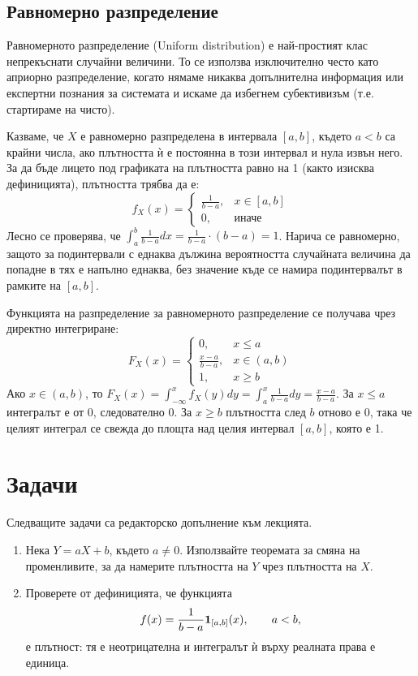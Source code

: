 \subsection{Равномерно разпределение}

Равномерното разпределение (Uniform distribution) е най-простият клас непрекъснати случайни величини. То се използва изключително често като априорно разпределение, когато нямаме никаква допълнителна информация или експертни познания за системата и искаме да избегнем субективизъм (т.е. стартираме на чисто).

Казваме, че $X$ е равномерно разпределена в интервала $[a, b]$, където $a < b$ са крайни числа, ако плътността ѝ е постоянна в този интервал и нула извън него. За да бъде лицето под графиката на плътността равно на 1 (както изисква дефиницията), плътността трябва да е:
\[
f_X(x) = \begin{cases}
\frac{1}{b-a}, & x \in [a, b] \\
0, & \text{иначе}
\end{cases}
\]
Лесно се проверява, че $\int_{a}^{b} \frac{1}{b-a} dx = \frac{1}{b-a} \cdot (b-a) = 1$.
Нарича се равномерно, защото за подинтервали с еднаква дължина вероятността случайната величина да попадне в тях е напълно еднаква, без значение къде се намира подинтервалът в рамките на $[a, b]$.

Функцията на разпределение за равномерното разпределение се получава чрез директно интегриране:
\[
F_X(x) = \begin{cases}
0, & x \le a \\
\frac{x-a}{b-a}, & x \in (a, b) \\
1, & x \ge b
\end{cases}
\]
Ако $x \in (a, b)$, то $F_X(x) = \int_{-\infty}^{x} f_X(y) dy = \int_{a}^{x} \frac{1}{b-a} dy = \frac{x-a}{b-a}$.
За $x \le a$ интегралът е от 0, следователно $0$. За $x \ge b$ плътността след $b$ отново е 0, така че целият интеграл се свежда до площта над целия интервал $[a, b]$, която е 1.

\section{Задачи}

Следващите задачи са редакторско допълнение към лекцията.

\begin{enumerate}
    \item Нека $Y=aX+b$, където $a\ne0$. Използвайте теоремата за смяна на променливите, за да намерите плътността на $Y$ чрез плътността на $X$.
    \item Проверете от дефиницията, че функцията
    \[
    f(x)=\frac{1}{b-a}\mathbf{1}_{[a,b]}(x),\qquad a<b,
    \]
    е плътност: тя е неотрицателна и интегралът ѝ върху реалната права е единица.
\end{enumerate}

